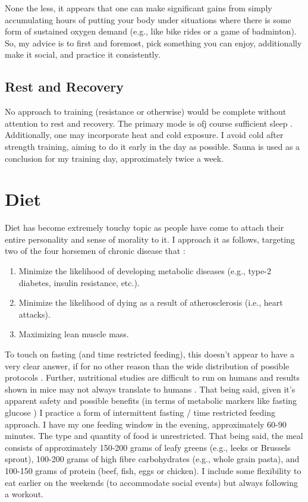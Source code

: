 \documentclass[10pt,twocolumn]{extarticle}
\begin{document}
None the less, it appears that one can make significant gains from simply accumulating hours of putting your body under situations where there is some form of sustained oxygen demand (e.g., like bike rides or a game of badminton)\cite{galpin_strengthen_2024}. So, my advice is to first and foremost, pick something you can enjoy, additionally make it social, and practice it consistently.


\subsection{Rest and Recovery}
No approach to training (resistance or otherwise) would be complete without attention to rest and recovery. The primary mode is ofj course sufficient sleep \cite{rae2017one}. Additionally, one may incorporate heat \cite{huberman2022heat} and cold \cite{huberman2022cold} exposure. I avoid cold after strength training, aiming to do it early in the day as possible. Sauna is used as a conclusion for my training day, approximately twice a week. 

\section{Diet}
\label{sec:diet}
Diet has become extremely touchy topic as people have come to attach their entire personality and sense of morality to it. I approach it as follows, targeting two of the four horsemen of chronic disease that \cite{attia2022fourhorsemen}: 
\begin{enumerate}
    \item Minimize the likelihood of developing metabolic diseases (e.g., type-2 diabetes, insulin resistance, etc.).
    \item Minimize the likelihood of dying as a result of atherosclerosis (i.e., heart attacks).
    \item Maximizing lean muscle mass.
\end{enumerate}

To touch on fasting (and time restricted feeding), this doesn't appear to have a very clear answer, if for no other reason than the wide distribution of possible protocols  \cite{attia2024special}. Further, nutritional studies are difficult to run on humans and results shown in mice may not always translate to humans \cite{antoni2017effects}.  That being said, given it's apparent safety and possible benefits (in terms of metabolic markers like fasting glucose \cite{pellegrini2020effects})  I practice a form of intermittent fasting / time restricted feeding approach. I have my one feeding window in the evening, approximately 60-90 minutes. The type and quantity of food is unrestricted. That being said, the meal consists of approximately 150-200 grams of leafy greens (e.g., leeks or Brussels sprout), 100-200 grams of high fibre carbohydrates (e.g., whole grain pasta), and 100-150 grams of protein (beef, fish, eggs or chicken). I include some flexibility to eat earlier on the weekends (to accommodate social events) but always following a workout.
\end{document}
